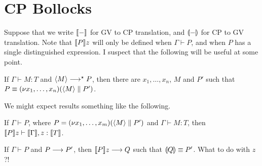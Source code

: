 \documentclass[orivec,envcountsame]{llncs}
\begin{document}
\section{CP Bollocks}

Suppose that we write $\llbracket - \rrbracket$ for GV to CP translation, and $\llparenthesis - \rrparenthesis$ for CP to GV translation.
Note that $\llbracket P \rrbracket z$ will only be defined when $\Gamma \vdash P$, and when $P$ has a single
distinguished expression.  I suspect that the following will be useful at some point.
\begin{lemma}
  If $\Gamma \vdash M: T$ and $\langle M \rangle \longrightarrow^\star P$, then there are $x_1,\dots,x_n$, $M$ and $P'$
  such that $P \equiv (\nu x_1,\dots,x_n)(\langle M \rangle \parallel P')$.
\end{lemma}

We might expect results something like the following.

\begin{theorem}
  If $\Gamma \vdash P$, where $P = (\nu x_1,\dots,x_m)(\langle M \rangle \parallel P')$ and $\Gamma
  \vdash M: T$, then $\llbracket P \rrbracket z \vdash \llbracket \Gamma \rrbracket, z:\llbracket T \rrbracket$.
\end{theorem}

\begin{theorem}
  If $\Gamma \vdash P$ and $P \longrightarrow P'$, then $\llbracket P \rrbracket z \longrightarrow Q$ such that $\llparenthesis Q \rrparenthesis
  \equiv P'$.  What to do with $z$?!
\end{theorem}
\end{document}
